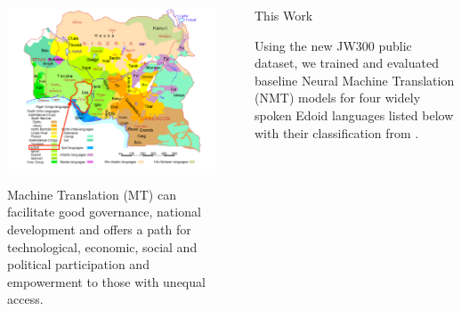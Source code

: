 \documentclass[final]{beamer}
\newlength{\sepwid}
\newlength{\onecolwid}
\begin{document}
\begin{frame}[t]
\begin{columns}[t]
\begin{column}{\onecolwid}
\begin{block}{}
\begin{center}
 \includegraphics[trim = 25mm 0mm 5mm 3mm, clip, width=1.2\textwidth]{figures/Edoid.pdf}
\end{center}

\vspace{5mm}

Machine Translation (MT) can facilitate good governance, national development and offers a path for technological, economic, social and political participation and empowerment to those with unequal access. 

\end{block}

\vspace{5mm}

\end{column} %

\begin{column}{\sepwid}\end{column} %

\begin{column}{\onecolwid}


\begin{block}{This Work}

Using the new JW300 public dataset, we trained and evaluated baseline Neural Machine Translation (NMT) models for four widely spoken Edoid languages listed below with their classification from \cite{elugbe1989comparative}. \\

\vspace{5mm}


\end{block}
\end{column}
\end{columns}
\end{frame}
\end{document}
